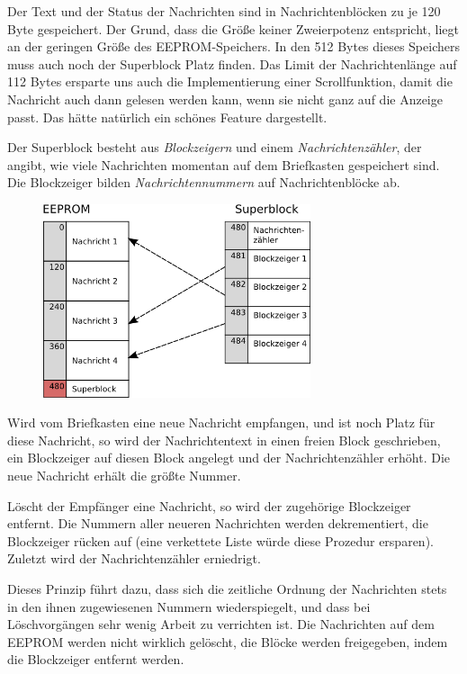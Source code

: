 \documentclass[ngerman]{article}
\begin{document}
Der Text und der Status der Nachrichten sind in
Nachrichtenblöcken zu je 120 Byte gespeichert. Der Grund, dass die
Größe keiner Zweierpotenz entspricht, liegt an der geringen Größe
des EEPROM-Speichers. In den 512 Bytes dieses Speichers muss auch
noch der Superblock Platz finden. Das Limit der Nachrichtenlänge
auf 112 Bytes ersparte uns auch die Implementierung einer Scrollfunktion, damit 
die Nachricht auch dann gelesen werden kann, wenn sie nicht ganz
auf die Anzeige passt. Das hätte natürlich ein schönes Feature
dargestellt.

Der Superblock besteht aus \textit{Blockzeigern} und einem \textit{Nachrichtenzähler},
der angibt, wie viele Nachrichten momentan auf dem Briefkasten
gespeichert sind. Die Blockzeiger bilden \textit{Nachrichtennummern}
auf Nachrichtenblöcke ab.

\begin{figure}[h!] \begin{center}
    \includegraphics[width=0.7\textwidth]{media/eeprom}
\end{center} \end{figure}

Wird vom Briefkasten eine neue Nachricht  
empfangen, und ist noch Platz für diese Nachricht, so wird 
der Nachrichtentext in einen freien Block geschrieben,
ein Blockzeiger auf diesen Block angelegt und der Nachrichtenzähler
erhöht. Die neue Nachricht erhält die größte Nummer. 

Löscht der Empfänger eine Nachricht, so wird der zugehörige
Blockzeiger entfernt. Die Nummern aller neueren Nachrichten werden
dekrementiert, die Blockzeiger rücken auf (eine verkettete Liste würde
diese Prozedur ersparen). Zuletzt wird der Nachrichtenzähler erniedrigt.

Dieses Prinzip führt dazu, dass sich die zeitliche Ordnung der
Nachrichten stets in den ihnen zugewiesenen Nummern wiederspiegelt,
und dass bei Löschvorgängen sehr wenig Arbeit zu verrichten ist. Die
Nachrichten auf dem EEPROM werden nicht wirklich gelöscht, die Blöcke
werden freigegeben, indem die Blockzeiger entfernt werden.
\end{document}
